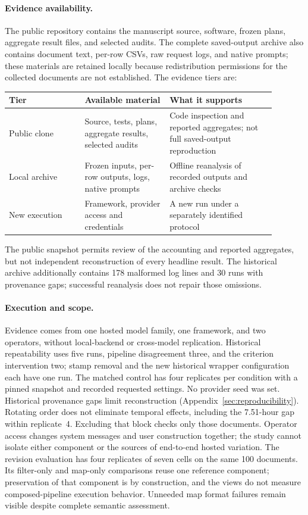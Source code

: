 \documentclass[11pt]{article}
\begin{document}
\paragraph{Evidence availability.}
The public repository contains the manuscript source, software, frozen plans,
aggregate result files, and selected audits. The complete saved-output archive
also contains document text, per-row CSVs, raw request logs, and native prompts;
these materials are retained locally because redistribution permissions for the
collected documents are not established. The evidence tiers are:

\begin{center}
\small
\begin{tabular}{p{0.25\linewidth}p{0.29\linewidth}p{0.35\linewidth}}
\toprule
Tier & Available material & What it supports \\
\midrule
Public clone & Source, tests, plans, aggregate results, selected audits & Code inspection and reported aggregates; not full saved-output reproduction \\
Local archive & Frozen inputs, per-row outputs, logs, native prompts & Offline reanalysis of recorded outputs and archive checks \\
New execution & Framework, provider access and credentials & A new run under a separately identified protocol \\
\bottomrule
\end{tabular}
\end{center}

The public snapshot permits review of the accounting and reported aggregates,
but not independent reconstruction of every headline result. The historical
archive additionally contains 178 malformed log lines and 30 runs with
provenance gaps; successful reanalysis does not repair those omissions.

\paragraph{Execution and scope.}
Evidence comes from one hosted model family, one framework, and two
operators, without local-backend or cross-model replication. Historical
repeatability uses five runs, pipeline disagreement three, and the criterion
intervention two; stamp removal and the new historical wrapper configuration
each have one run. The matched control has four replicates per condition with
a pinned snapshot and recorded requested settings. No provider seed was set.
Historical provenance gaps limit reconstruction
(Appendix~\ref{sec:reproducibility}). Rotating order does not eliminate temporal
effects, including the 7.51-hour gap within replicate~4. Excluding that block
checks only those documents. Operator access changes system messages and user
construction together; the study cannot isolate either component or the
sources of end-to-end hosted variation.
The revision evaluation has four replicates of seven cells on the same 100
documents. Its filter-only and map-only comparisons reuse one reference
component; preservation of that component is by construction, and the views
do not measure composed-pipeline execution behavior. Unneeded map format
failures remain visible despite complete semantic assessment.
\end{document}
